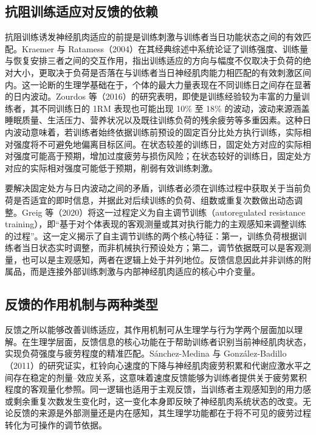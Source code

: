\documentclass[UTF8,zihao=-4,twoside,openany]{ctexbook}
\begin{document}
\subsection{抗阻训练适应对反馈的依赖}
抗阻训练诱发神经肌肉适应的前提是训练刺激与训练者当日功能状态之间的有效匹配。Kraemer 与 Ratamess（2004）在其经典综述中系统论证了训练强度、训练量与恢复安排三者之间的交互作用，指出训练适应的方向与幅度不仅取决于负荷的绝对大小，更取决于负荷是否落在与训练者当日神经肌肉能力相匹配的有效刺激区间内。这一论断的生理学基础在于，个体的最大力量表现在不同训练日之间存在显著的日内波动。Zourdos 等（2016）的研究表明，即使是训练经验较为丰富的力量训练者，其不同训练日的 1RM 表现也可能出现 10\% 至 18\% 的波动，波动来源涵盖睡眠质量、生活压力、营养状况以及既往训练负荷的残余疲劳等多重因素。这种日内波动意味着，若训练者始终依据训练前预设的固定百分比处方执行训练，实际相对强度将不可避免地偏离目标区间。在状态较差的训练日，固定处方对应的实际相对强度可能高于预期，增加过度疲劳与损伤风险；在状态较好的训练日，固定处方对应的实际相对强度可能低于预期，削弱有效训练刺激。

要解决固定处方与日内波动之间的矛盾，训练者必须在训练过程中获取关于当前负荷是否适宜的即时信息，并据此对后续训练的负荷、组数或重复次数做出动态调整。Greig 等（2020）将这一过程定义为自主调节训练（autoregulated resistance training），即“基于对个体表现的客观测量或其对执行能力的主观感知来调整训练的过程”。这一定义揭示了自主调节训练的两个核心特征：第一，训练负荷根据训练者当日状态实时调整，而非机械执行预设处方；第二，调节依据既可以是客观测量，也可以是主观感知，两者在逻辑上处于并列地位。反馈信息因此并非训练的附属品，而是连接外部训练刺激与内部神经肌肉适应的核心中介变量。

\subsection{反馈的作用机制与两种类型}
反馈之所以能够改善训练适应，其作用机制可从生理学与行为学两个层面加以理解。在生理学层面，反馈信息的核心功能在于帮助训练者识别当前神经肌肉状态，实现负荷强度与疲劳程度的精准匹配。Sánchez-Medina 与 González-Badillo（2011）的研究证实，杠铃向心速度的下降与神经肌肉疲劳积累和代谢应激水平之间存在稳定的剂量--效应关系，这意味着速度反馈能够为训练者提供关于疲劳累积程度的客观量化参照。同一逻辑也适用于主观反馈，当训练者主观感知到的用力感或剩余重复次数发生变化时，这一变化本身即反映了神经肌肉系统状态的改变。无论反馈的来源是外部测量还是内在感知，其生理学功能都在于将不可见的疲劳过程转化为可操作的调节依据。
\end{document}

